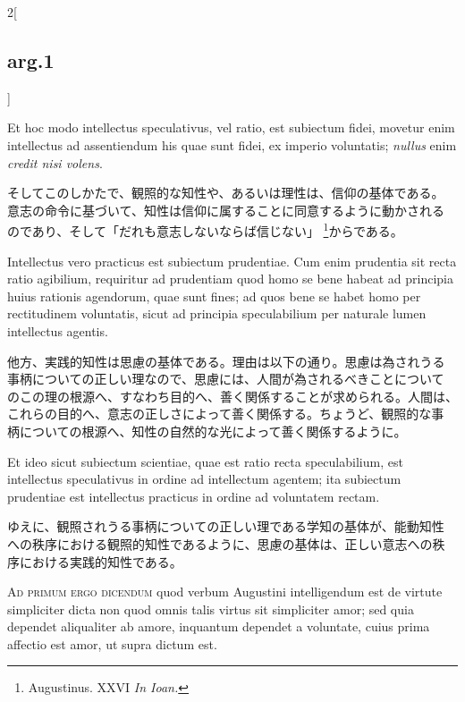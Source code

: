 \documentclass[paper=a4paper,fontsize=10pt,jafontsize=9pt,titlepage]{jlreq}
\begin{document}
\begin{paracol}{2}[\subsection{arg.1}]
\switchcolumn*

Et hoc modo intellectus speculativus, vel ratio, est subiectum fidei,
movetur enim intellectus ad assentiendum his quae sunt fidei, ex
imperio voluntatis; {\itshape nullus} enim {\itshape credit nisi
volens}.

\switchcolumn

そしてこのしかたで、観照的な知性や、あるいは理性は、信仰の基体である。
意志の命令に基づいて、知性は信仰に属することに同意するように動かされる
のであり、そして「だれも意志しないならば信じない」
\footnote{Augustinus. XXVI {\itshape In Ioan.}}からである。

\switchcolumn*

Intellectus vero practicus est subiectum prudentiae.  Cum enim
prudentia sit recta ratio agibilium, requiritur ad prudentiam quod
homo se bene habeat ad principia huius rationis agendorum, quae sunt
fines; ad quos bene se habet homo per rectitudinem voluntatis, sicut
ad principia speculabilium per naturale lumen intellectus agentis.

\switchcolumn

他方、実践的知性は思慮の基体である。理由は以下の通り。思慮は為されうる
事柄についての正しい理なので、思慮には、人間が為されるべきことについて
のこの理の根源へ、すなわち目的へ、善く関係することが求められる。人間は、
これらの目的へ、意志の正しさによって善く関係する。ちょうど、観照的な事
柄についての根源へ、知性の自然的な光によって善く関係するように。

\switchcolumn*

Et ideo sicut subiectum scientiae, quae est ratio recta speculabilium,
est intellectus speculativus in ordine ad intellectum agentem; ita
subiectum prudentiae est intellectus practicus in ordine ad voluntatem
rectam.

\switchcolumn

ゆえに、観照されうる事柄についての正しい理である学知の基体が、能動知性
への秩序における観照的知性であるように、思慮の基体は、正しい意志への秩
序における実践的知性である。

\switchcolumn*[\subsection{ad.1}]

{\scshape Ad primum ergo dicendum} quod verbum Augustini intelligendum
est de virtute simpliciter dicta non quod omnis talis virtus sit
simpliciter amor; sed quia dependet aliqualiter ab amore, inquantum
dependet a voluntate, cuius prima affectio est amor, ut supra dictum
est.


\end{paracol}
\end{document}
